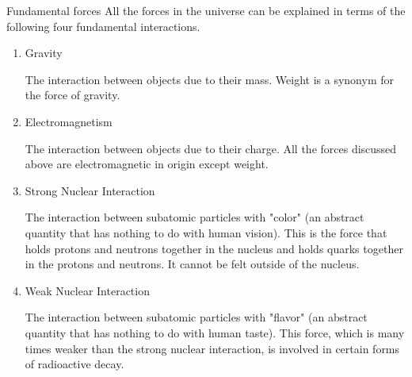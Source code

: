 \documentclass[18pt]{LectMechanics}
\begin{document}
\begin{frame}{Fundamental forces}{}\footnotesize
	All the forces in the universe can be explained in terms of the following four fundamental interactions.
	\begin{enumerate}
		\item Gravity

		      The interaction between objects due to their mass. Weight is a synonym for the force of gravity.
		\item Electromagnetism

		      The interaction between objects due to their charge. All the forces discussed above are electromagnetic in origin except weight.

		\item Strong Nuclear Interaction

		      The interaction between subatomic particles with "color" (an abstract quantity that has nothing to do with human vision). This is the force that holds protons and neutrons together in the nucleus and holds quarks together in the protons and neutrons. It cannot be felt outside of the nucleus.

		\item Weak Nuclear Interaction

		      The interaction between subatomic particles with "flavor" (an abstract quantity that has nothing to do with human taste). This force, which is many times weaker than the strong nuclear interaction, is involved in certain forms of radioactive decay.
	\end{enumerate}
\end{frame}
\end{document}

